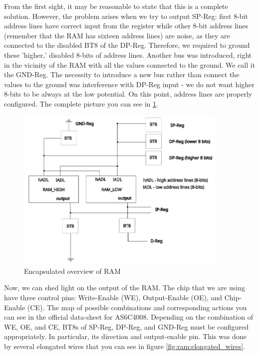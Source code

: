 From the first sight, it may be reasonable to state that this is a complete solution. However, the problem arises when we try to output SP-Reg: first 8-bit address lines have correct input from the register while other 8-bit address lines (remember that the RAM has sixteen address lines) are noise, as they are connected to the disabled BT8 of the DP-Reg. Therefore, we required to ground these 'higher,' disabled 8-bits of address lines. Another bus was introduced, right in the vicinity of the RAM with all the values connected to the ground. We call it the GND-Reg. The necessity to introduce a new bus rather than connect the values to the ground was interference with DP-Reg input - we do not want higher 8-bits to be always at the low potential. On this point, address lines are properly configured. The complete picture you can see in \ref{fig:ram}.

\begin{figure}[H]
	\centering
	\includegraphics[width=0.9\textwidth]{img/ram}
	\caption{Encapsulated overview of RAM}
	\label{fig:ram}
\end{figure}

Now, we can shed light on the output of the RAM. The chip that we are using have three control pins: Write-Enable (WE), Output-Enable (OE), and Chip-Enable (CE). The map of possible combinations and corresponding actions you can see in the official data-sheet for AS6C4008. Depending on the combination of WE, OE, and CE, BT8s of SP-Reg, DP-Reg, and GND-Reg must be configured appropriately. In particular, its direction and output-enable pin. This was done by several elongated wires that you can see in figure \ref{fig:ram:elongated_wires}.

